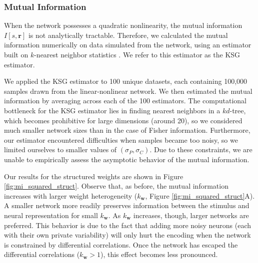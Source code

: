 \documentclass[12pt]{article}
\begin{document}
\subsubsection{Mutual Information}
When the network possesses a quadratic nonlinearity, the mutual information $I[s,\mathbf{r}]$ is not analytically tractable. Therefore, we calculated the mutual information numerically on data simulated from the network, using an estimator built on $k$-nearest neighbor statistics \citep{kraskov2004}. We refer to this estimator as the KSG estimator. 
	
We applied the KSG estimator to 100 unique datasets, each containing 100,000 samples drawn from the linear-nonlinear network. We then estimated the mutual information by averaging across each of the 100 estimators. The computational bottleneck for the KSG estimator lies in finding nearest neighbors in a $kd$-tree, which becomes prohibitive for large dimensions (around 20), so we considered much smaller network sizes than in the case of Fisher information. Furthermore, our estimator encountered difficulties when samples became too noisy, so we limited ourselves to smaller values of $(\sigma_P, \sigma_C)$. Due to these constraints, we are unable to empirically assess the asymptotic behavior of the mutual information.
	
Our results for the structured weights are shown in Figure \ref{fig:mi_squared_struct}. Observe that, as before, the mutual information increases with larger weight heterogeneity ($k_{\mathbf{w}}$, Figure \ref{fig:mi_squared_struct}A). A smaller network more readily preserves information between the stimulus and neural representation for small $k_{\mathbf{w}}$. As $k_{\mathbf{w}}$ increases, though, larger networks are preferred. This behavior is due to the fact that adding more noisy neurons (each with their own private variability) will only hurt the encoding when the network is constrained by differential correlations. Once the network has escaped the differential correlations ($k_{\mathbf{w}} > 1$), this effect becomes less pronounced.
\end{document}
